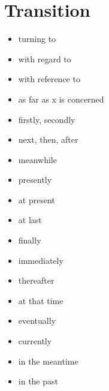 \documentclass[twocolumn, a4paper]{article}
\begin{document}
\section{Transition}
{\color{NavyBlue}
	\begin{itemize}[leftmargin=*, noitemsep]
		\item turning to
		\item with regard to
		\item with reference to
		\item as far as x is concerned
		\item firstly, secondly
		\item next, then, after
		\item meanwhile
		\item presently
		\item at present
		\item at last
		\item finally
		\item immediately
		\item thereafter
		\item at that time
		\item eventually
		\item currently
		\item in the meantime
		\item in the past
	\end{itemize}
}
\end{document}
